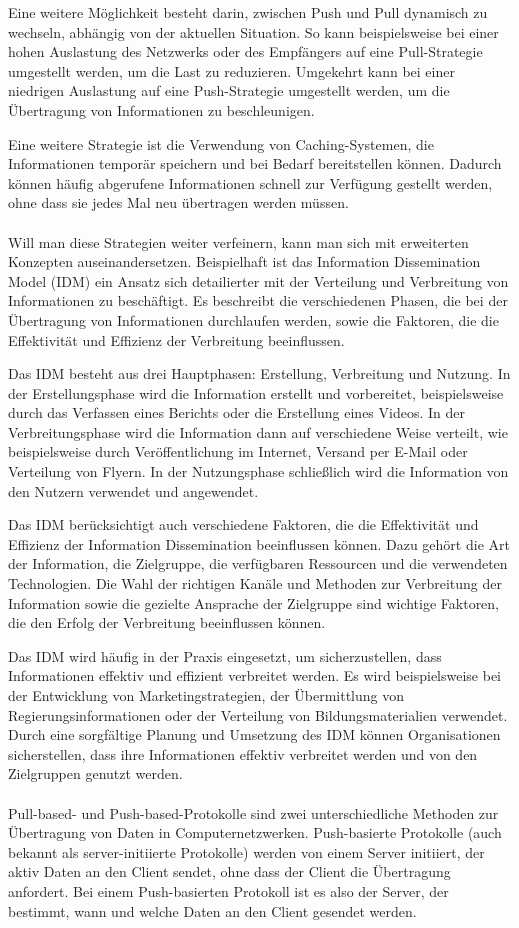 Eine weitere Möglichkeit besteht darin, zwischen Push und Pull dynamisch zu wechseln, abhängig von der aktuellen Situation. So kann beispielsweise bei einer hohen Auslastung des Netzwerks oder des Empfängers auf eine Pull-Strategie umgestellt werden, um die Last zu reduzieren. Umgekehrt kann bei einer niedrigen Auslastung auf eine Push-Strategie umgestellt werden, um die Übertragung von Informationen zu beschleunigen.

Eine weitere Strategie ist die Verwendung von Caching-Systemen, die Informationen temporär speichern und bei Bedarf bereitstellen können. Dadurch können häufig abgerufene Informationen schnell zur Verfügung gestellt werden, ohne dass sie jedes Mal neu übertragen werden müssen.
\\\\
Will man diese Strategien weiter verfeinern, kann man sich mit erweiterten Konzepten auseinandersetzen. Beispielhaft ist das Information Dissemination Model (IDM) ein Ansatz sich detailierter mit der Verteilung und Verbreitung von Informationen zu beschäftigt. Es beschreibt die verschiedenen Phasen, die bei der Übertragung von Informationen durchlaufen werden, sowie die Faktoren, die die Effektivität und Effizienz der Verbreitung beeinflussen.

Das IDM besteht aus drei Hauptphasen: Erstellung, Verbreitung und Nutzung. In der Erstellungsphase wird die Information erstellt und vorbereitet, beispielsweise durch das Verfassen eines Berichts oder die Erstellung eines Videos. In der Verbreitungsphase wird die Information dann auf verschiedene Weise verteilt, wie beispielsweise durch Veröffentlichung im Internet, Versand per E-Mail oder Verteilung von Flyern. In der Nutzungsphase schließlich wird die Information von den Nutzern verwendet und angewendet.

Das IDM berücksichtigt auch verschiedene Faktoren, die die Effektivität und Effizienz der Information Dissemination beeinflussen können. Dazu gehört die Art der Information, die Zielgruppe, die verfügbaren Ressourcen und die verwendeten Technologien. Die Wahl der richtigen Kanäle und Methoden zur Verbreitung der Information sowie die gezielte Ansprache der Zielgruppe sind wichtige Faktoren, die den Erfolg der Verbreitung beeinflussen können.

Das IDM wird häufig in der Praxis eingesetzt, um sicherzustellen, dass Informationen effektiv und effizient verbreitet werden. Es wird beispielsweise bei der Entwicklung von Marketingstrategien, der Übermittlung von Regierungsinformationen oder der Verteilung von Bildungsmaterialien verwendet. Durch eine sorgfältige Planung und Umsetzung des IDM können Organisationen sicherstellen, dass ihre Informationen effektiv verbreitet werden und von den Zielgruppen genutzt werden.
\\\\
Pull-based- und Push-based-Protokolle sind zwei unterschiedliche Methoden zur Übertragung von Daten in Computernetzwerken. Push-basierte Protokolle (auch bekannt als server-initiierte Protokolle) werden von einem Server initiiert, der aktiv Daten an den Client sendet, ohne dass der Client die Übertragung anfordert. Bei einem Push-basierten Protokoll ist es also der Server, der bestimmt, wann und welche Daten an den Client gesendet werden.

